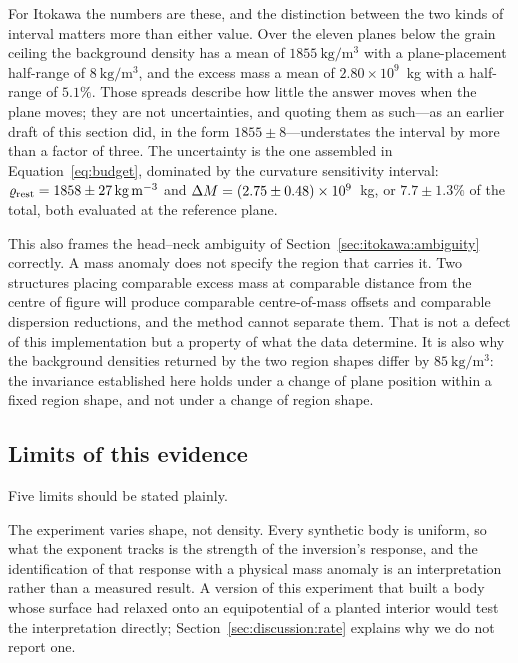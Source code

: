 For Itokawa the numbers are these, and the distinction between the two kinds
of interval matters more than either value. Over the eleven planes below
the grain ceiling the background density has a mean of
$\SI{1855}{\kilo\gram\per\cubic\metre}$ with a plane-placement half-range of
$\SI{8}{\kilo\gram\per\cubic\metre}$, and the excess mass a mean of
$2.80\times10^{9}$~kg with a half-range of $5.1\%$. Those spreads describe
how little the answer moves when the plane moves; they are not
uncertainties, and quoting them as such---as an earlier draft of this
section did, in the form $1855\pm8$---understates the interval by more than
a factor of three. The uncertainty is the one assembled in
Equation~\eqref{eq:budget}, dominated by the curvature sensitivity interval:
$\varrho_{\mathrm{rest}} = 1858\pm\SI{27}{\kilo\gram\per\cubic\metre}$ and
$\Delta M = (2.75\pm0.48)\times10^{9}$~kg, or $7.7\pm1.3\%$ of the total, both
evaluated at the reference plane.

This also frames the head--neck ambiguity of
Section~\ref{sec:itokawa:ambiguity} correctly. A mass anomaly does not
specify the region that carries it. Two structures placing comparable excess
mass at comparable distance from the centre of figure will produce
comparable centre-of-mass offsets and comparable dispersion reductions, and
the method cannot separate them. That is not a defect of this implementation
but a property of what the data determine. It is also why the background
densities returned by the two region shapes differ by
$\SI{85}{\kilo\gram\per\cubic\metre}$: the invariance established here holds
under a change of plane position within a fixed region shape, and not under
a change of region shape.

\subsection{Limits of this evidence}
\label{sec:constrains:limits}

Five limits should be stated plainly.

The experiment varies shape, not density. Every synthetic body is uniform,
so what the exponent tracks is the strength of the inversion's response, and
the identification of that response with a physical mass anomaly is an
interpretation rather than a measured result. A version of this experiment
that built a body whose surface had relaxed onto an equipotential of a
planted interior would test the interpretation directly;
Section~\ref{sec:discussion:rate} explains why we do not report one.


